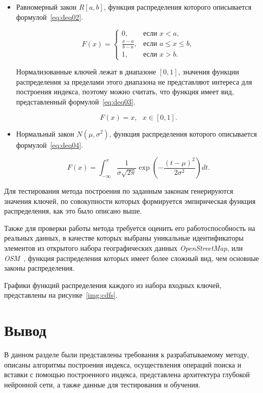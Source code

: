 \begin{itemize}
    \item Равномерный закон $R[a,b]$, функция распределения которого описывается
        формулой~\eqref{eq:deq02}.

        \begin{equation}\label{eq:deq02}
            F(x) = \begin{cases}
                0, & \text{если } x < a, \\
                \frac{x - a}{b - a}, & \text{если } a \leq x \leq b, \\
                1, & \text{если } x > b.
            \end{cases}
        \end{equation}

        Нормализованные ключей лежат в диапазоне $[0, 1]$, значения функции
        распределения за пределами этого диапазона не представляют интереса для
        построения индекса, поэтому можно считать, что функция имеет вид,
        представленный формулой~\eqref{eq:deq03}.

        \begin{equation}\label{eq:deq03}
            F(x) = x, \text{  } x \in [0, 1].
        \end{equation}

    \item Нормальный закон $N(\mu, \sigma^2)$, функция распределения которого
        описывается формулой~\eqref{eq:deq04}.

        \begin{equation}\label{eq:deq04}
            F(x) = \int_{-\infty}^{x} \frac{1}{{\sigma \sqrt{2\pi}}}
            \exp\left(-\frac{{(t - \mu)^2}}{{2\sigma^2}}\right) dt.
        \end{equation}
\end{itemize}

Для тестирования метода построения по заданным законам генерируются значения
ключей, по совокупности которых формируется эмпирическая функция распределения,
как это было описано выше.

Также для проверки работы метода требуется оценить его работоспособность на
реальных данных, в качестве которых выбраны уникальные идентификаторы элементов
из открытого набора географических данных \textit{OpenStreetMap}, или
\textit{OSM}~\cite{osm}, функция распределения которых имеет более сложный вид,
чем основные законы распределения.

Графики функций распределения каждого из набора входных ключей, представлены на
рисунке~\ref{img:cdfs}.


\section*{Вывод}

В данном разделе были представлены требования к разрабатываемому методу, описаны
алгоритмы построения индекса, осуществления операций поиска и вставки с помощью
построенного индекса, представлена архитектура глубокой нейронной сети, а также
данные для тестирования и обучения.
